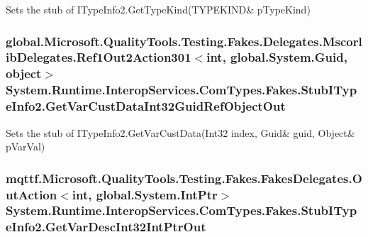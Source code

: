Sets the stub of I\-Type\-Info2.\-Get\-Type\-Kind(T\-Y\-P\-E\-K\-I\-N\-D\& p\-Type\-Kind)

\hypertarget{class_system_1_1_runtime_1_1_interop_services_1_1_com_types_1_1_fakes_1_1_stub_i_type_info2_a5bc85c9686d7564ef6a133789c8ff995}{
\subsubsection[{Get\-Var\-Cust\-Data\-Int32\-Guid\-Ref\-Object\-Out}]{\setlength{\rightskip}{0pt plus 5cm}global.\-Microsoft.\-Quality\-Tools.\-Testing.\-Fakes.\-Delegates.\-Mscorlib\-Delegates.\-Ref1\-Out2\-Action301$<$int, global.\-System.\-Guid, object$>$ System.\-Runtime.\-Interop\-Services.\-Com\-Types.\-Fakes.\-Stub\-I\-Type\-Info2.\-Get\-Var\-Cust\-Data\-Int32\-Guid\-Ref\-Object\-Out}}\label{class_system_1_1_runtime_1_1_interop_services_1_1_com_types_1_1_fakes_1_1_stub_i_type_info2_a5bc85c9686d7564ef6a133789c8ff995}


Sets the stub of I\-Type\-Info2.\-Get\-Var\-Cust\-Data(Int32 index, Guid\& guid, Object\& p\-Var\-Val)

\hypertarget{class_system_1_1_runtime_1_1_interop_services_1_1_com_types_1_1_fakes_1_1_stub_i_type_info2_ae8e749d8d1234277eba7e584a8367eeb}{
\subsubsection[{Get\-Var\-Desc\-Int32\-Int\-Ptr\-Out}]{\setlength{\rightskip}{0pt plus 5cm}mqttf.\-Microsoft.\-Quality\-Tools.\-Testing.\-Fakes.\-Fakes\-Delegates.\-Out\-Action$<$int, global.\-System.\-Int\-Ptr$>$ System.\-Runtime.\-Interop\-Services.\-Com\-Types.\-Fakes.\-Stub\-I\-Type\-Info2.\-Get\-Var\-Desc\-Int32\-Int\-Ptr\-Out}}\label{class_system_1_1_runtime_1_1_interop_services_1_1_com_types_1_1_fakes_1_1_stub_i_type_info2_ae8e749d8d1234277eba7e584a8367eeb}


